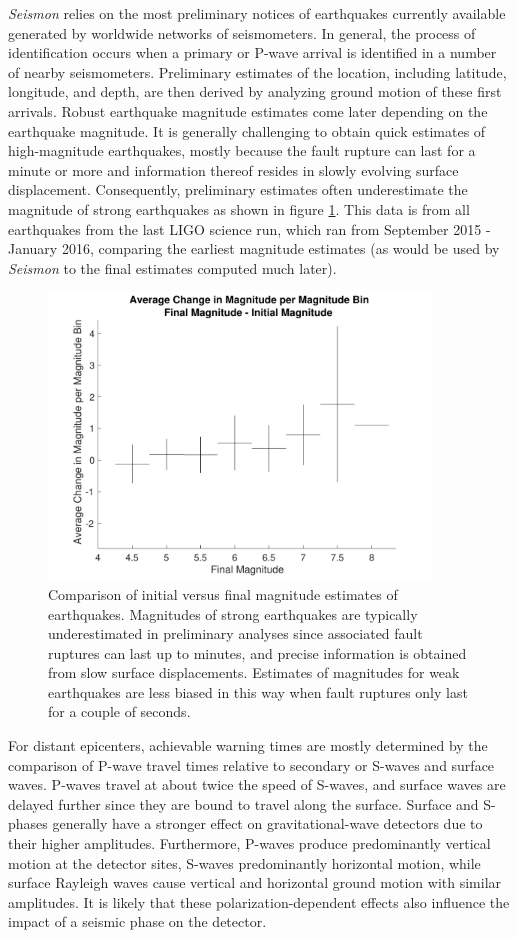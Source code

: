 \documentclass[twocolumn, aps, superscriptaddress]{revtex4}
\begin{document}
\emph{Seismon} relies on the most preliminary notices of earthquakes currently available generated by worldwide networks of seismometers. In general, the process of identification occurs when a primary or P-wave arrival is identified in a number of nearby seismometers. Preliminary estimates of the location, including latitude, longitude, and depth, are then derived by analyzing ground motion of these first arrivals. Robust earthquake magnitude estimates come later depending on the earthquake magnitude. It is generally challenging to obtain quick estimates of high-magnitude earthquakes, mostly because the fault rupture can last for a minute or more and information thereof resides in slowly evolving surface displacement. Consequently, preliminary estimates often underestimate the magnitude of strong earthquakes as shown in figure \ref{fig:initialfinal}. This data is from all earthquakes from the last LIGO science run, which ran from September 2015 - January 2016, comparing the earliest magnitude estimates (as would be used by \emph{Seismon} to the final estimates computed much later).
\begin{figure}[t]
\hspace*{-0.5cm}
\centering
\includegraphics[width=4in]{AverageChange.pdf}
\caption{Comparison of initial versus final magnitude estimates of earthquakes. Magnitudes of strong earthquakes are typically underestimated in preliminary analyses since associated fault ruptures can last up to minutes, and precise information is obtained from slow surface displacements. Estimates of magnitudes for weak earthquakes are less biased in this way when fault ruptures only last for a couple of seconds.}
 \label{fig:initialfinal}
 \end{figure}

For distant epicenters, achievable warning times are mostly determined by the comparison of P-wave travel times relative to secondary or S-waves and surface waves. P-waves travel at about twice the speed of S-waves, and surface waves are delayed further since they are bound to travel along the surface. Surface and S-phases generally have a stronger effect on gravitational-wave detectors due to their higher amplitudes. Furthermore, P-waves produce predominantly vertical motion at the detector sites, S-waves predominantly horizontal motion, while surface Rayleigh waves cause vertical and horizontal ground motion with similar amplitudes. It is likely that these polarization-dependent effects also influence the impact of a seismic phase on the detector.
\end{document}
